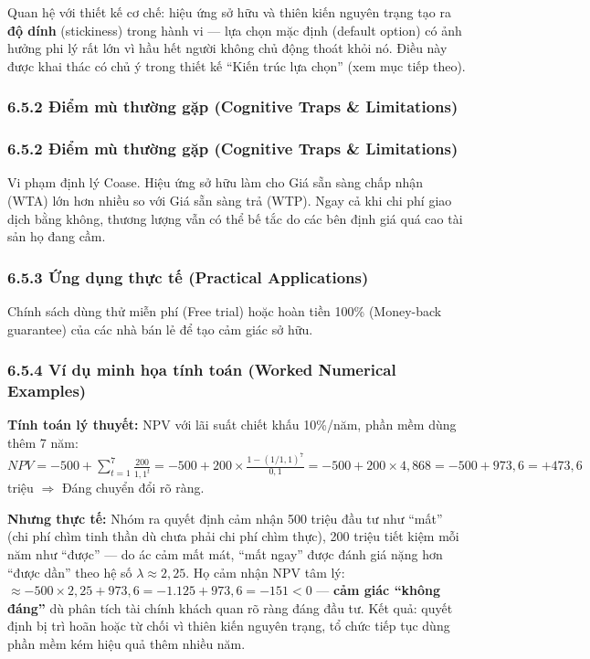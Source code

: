 \documentclass[
]{article}
\begin{document}
Quan hệ với thiết kế cơ chế: hiệu ứng sở hữu và thiên kiến nguyên trạng
tạo ra \textbf{độ dính} (stickiness) trong hành vi --- lựa chọn mặc định
(default option) có ảnh hưởng phi lý rất lớn vì hầu hết người không chủ
động thoát khỏi nó. Điều này được khai thác có chủ ý trong thiết kế
``Kiến trúc lựa chọn'' (xem mục tiếp theo).

\subsubsection{6.5.2 Điểm mù thường gặp (Cognitive Traps \&
Limitations)}\label{ux111iux1ec3m-muxf9-thux1b0ux1eddng-gux1eb7p-cognitive-traps-limitations-23}

\subsubsection{6.5.2 Điểm mù thường gặp (Cognitive Traps \&
Limitations)}\label{ux111iux1ec3m-muxf9-thux1b0ux1eddng-gux1eb7p-cognitive-traps-limitations-24}

Vi phạm định lý Coase. Hiệu ứng sở hữu làm cho Giá sẵn sàng chấp nhận
(WTA) lớn hơn nhiều so với Giá sẵn sàng trả (WTP). Ngay cả khi chi phí
giao dịch bằng không, thương lượng vẫn có thể bế tắc do các bên định giá
quá cao tài sản họ đang cầm.

\subsubsection{6.5.3 Ứng dụng thực tế (Practical
Applications)}\label{ux1ee9ng-dux1ee5ng-thux1ef1c-tux1ebf-practical-applications-13}

Chính sách dùng thử miễn phí (Free trial) hoặc hoàn tiền 100\%
(Money-back guarantee) của các nhà bán lẻ để tạo cảm giác sở hữu.

\subsubsection{6.5.4 Ví dụ minh họa tính toán (Worked Numerical
Examples)}\label{vuxed-dux1ee5-minh-hux1ecda-tuxednh-touxe1n-worked-numerical-examples-12}

\textbf{Tính toán lý thuyết:} NPV với lãi suất chiết khấu 10\%/năm, phần
mềm dùng thêm 7 năm:
\(NPV = -500 + \sum_{t=1}^{7} \frac{200}{1{,}1^t} = -500 + 200 \times \frac{1-(1/1{,}1)^7}{0{,}1} = -500 + 200 \times 4{,}868 = -500 + 973{,}6 = +473{,}6\)
triệu \(\Rightarrow\) Đáng chuyển đổi rõ ràng.

\textbf{Nhưng thực tế:} Nhóm ra quyết định cảm nhận 500 triệu đầu tư như
``mất'' (chi phí chìm tinh thần dù chưa phải chi phí chìm thực), 200
triệu tiết kiệm mỗi năm như ``được'' --- do ác cảm mất mát, ``mất ngay''
được đánh giá nặng hơn ``được dần'' theo hệ số
\(\lambda \approx 2{,}25\). Họ cảm nhận NPV tâm lý:
\(\approx -500 \times 2{,}25 + 973{,}6 = -1.125 + 973{,}6 = -151 < 0\)
--- \textbf{cảm giác ``không đáng''} dù phân tích tài chính khách quan
rõ ràng đáng đầu tư. Kết quả: quyết định bị trì hoãn hoặc từ chối vì
thiên kiến nguyên trạng, tổ chức tiếp tục dùng phần mềm kém hiệu quả
thêm nhiều năm.
\end{document}
